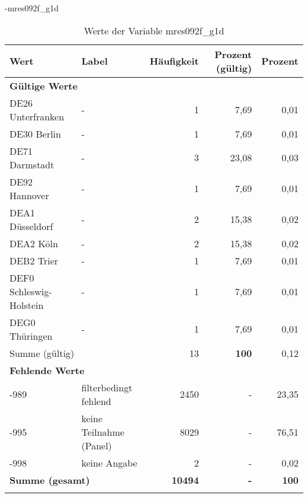                 \vspace*{-\baselineskip}
					\begin{filecontents}{\jobname-mres092f_g1d}
					\begin{longtable}{Xlrrr}
					\toprule
					\textbf{Wert} & \textbf{Label} & \textbf{Häufigkeit} & \textbf{Prozent (gültig)} & \textbf{Prozent} \\
					\endhead
					\midrule
					\multicolumn{5}{l}{\textbf{Gültige Werte}}\\

					\multicolumn{1}{X}{DE26 Unterfranken} &
					- &
					1 &
					7,69 &
					0,01 \\
					
					\multicolumn{1}{X}{DE30 Berlin} &
					- &
					1 &
					7,69 &
					0,01 \\
					
					\multicolumn{1}{X}{DE71 Darmstadt} &
					- &
					3 &
					23,08 &
					0,03 \\
					
					\multicolumn{1}{X}{DE92 Hannover} &
					- &
					1 &
					7,69 &
					0,01 \\
					
					\multicolumn{1}{X}{DEA1 Düsseldorf} &
					- &
					2 &
					15,38 &
					0,02 \\
					
					\multicolumn{1}{X}{DEA2 Köln} &
					- &
					2 &
					15,38 &
					0,02 \\
					
					\multicolumn{1}{X}{DEB2 Trier} &
					- &
					1 &
					7,69 &
					0,01 \\
					
					\multicolumn{1}{X}{DEF0 Schleswig-Holstein} &
					- &
					1 &
					7,69 &
					0,01 \\
					
					\multicolumn{1}{X}{DEG0 Thüringen} &
					- &
					1 &
					7,69 &
					0,01 \\
					\midrule
						\multicolumn{2}{l}{Summe (gültig)} & 13 &
						\textbf{100} &
					    0,12 \\
					\multicolumn{5}{l}{\textbf{Fehlende Werte}}\\
							-989 & filterbedingt fehlend & 2450 & - & 23,35 \\

							-995 & keine Teilnahme (Panel) & 8029 & - & 76,51 \\

							-998 & keine Angabe & 2 & - & 0,02 \\

					\midrule
					\multicolumn{2}{l}{\textbf{Summe (gesamt)}} & \textbf{10494} & \textbf{-} & \textbf{100} \\
					\bottomrule
					\caption{Werte der Variable mres092f\_g1d}
					\end{longtable}
					\end{filecontents}



